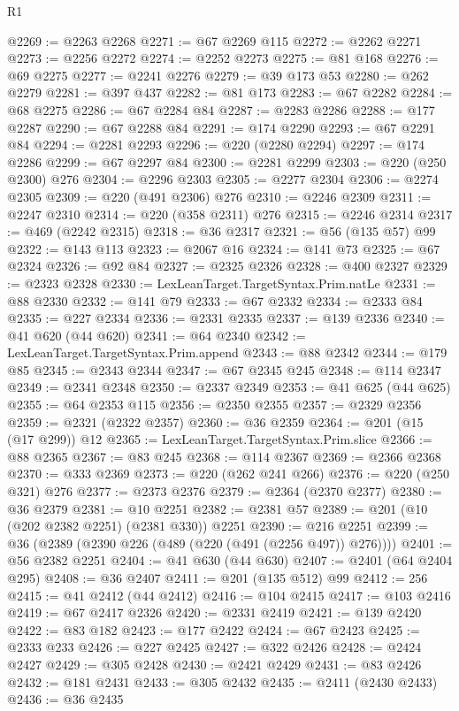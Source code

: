 \begin{lexlean}{R1}
\begin{coremodule}
@2269 := @2263 @2268
@2271 := @67 @2269 @115
@2272 := @2262 @2271
@2273 := @2256 @2272
@2274 := @2252 @2273
@2275 := @81 @168
@2276 := @69 @2275
@2277 := @2241 @2276
@2279 := @39 @173 @53
@2280 := @262 @2279
@2281 := @397 @437
@2282 := @81 @173
@2283 := @67 @2282
@2284 := @68 @2275
@2286 := @67 @2284 @84
@2287 := @2283 @2286
@2288 := @177 @2287
@2290 := @67 @2288 @84
@2291 := @174 @2290
@2293 := @67 @2291 @84
@2294 := @2281 @2293
@2296 := @220 (@2280 @2294)
@2297 := @174 @2286
@2299 := @67 @2297 @84
@2300 := @2281 @2299
@2303 := @220 (@250 @2300) @276
@2304 := @2296 @2303
@2305 := @2277 @2304
@2306 := @2274 @2305
@2309 := @220 (@491 @2306) @276
@2310 := @2246 @2309
@2311 := @2247 @2310
@2314 := @220 (@358 @2311) @276
@2315 := @2246 @2314
@2317 := @469 (@2242 @2315)
@2318 := @36 @2317
@2321 := @56 (@135 @57) @99
@2322 := @143 @113
@2323 := @2067 @16
@2324 := @141 @73
@2325 := @67 @2324
@2326 := @92 @84
@2327 := @2325 @2326
@2328 := @400 @2327
@2329 := @2323 @2328
@2330 := LexLeanTarget.TargetSyntax.Prim.natLe
@2331 := @88 @2330
@2332 := @141 @79
@2333 := @67 @2332
@2334 := @2333 @84
@2335 := @227 @2334
@2336 := @2331 @2335
@2337 := @139 @2336
@2340 := @41 @620 (@44 @620)
@2341 := @64 @2340
@2342 := LexLeanTarget.TargetSyntax.Prim.append
@2343 := @88 @2342
@2344 := @179 @85
@2345 := @2343 @2344
@2347 := @67 @2345 @245
@2348 := @114 @2347
@2349 := @2341 @2348
@2350 := @2337 @2349
@2353 := @41 @625 (@44 @625)
@2355 := @64 @2353 @115
@2356 := @2350 @2355
@2357 := @2329 @2356
@2359 := @2321 (@2322 @2357)
@2360 := @36 @2359
@2364 := @201 (@15 (@17 @299)) @12
@2365 := LexLeanTarget.TargetSyntax.Prim.slice
@2366 := @88 @2365
@2367 := @83 @245
@2368 := @114 @2367
@2369 := @2366 @2368
@2370 := @333 @2369
@2373 := @220 (@262 @241 @266)
@2376 := @220 (@250 @321) @276
@2377 := @2373 @2376
@2379 := @2364 (@2370 @2377)
@2380 := @36 @2379
@2381 := @10 @2251
@2382 := @2381 @57
@2389 := @201 (@10 (@202 @2382 @2251) (@2381 @330)) @2251
@2390 := @216 @2251
@2399 := @36 (@2389 (@2390 @226 (@489 (@220 (@491 (@2256 @497)) @276))))
@2401 := @56 @2382 @2251
@2404 := @41 @630 (@44 @630)
@2407 := @2401 (@64 @2404 @295)
@2408 := @36 @2407
@2411 := @201 (@135 @512) @99
@2412 := 256
@2415 := @41 @2412 (@44 @2412)
@2416 := @104 @2415
@2417 := @103 @2416
@2419 := @67 @2417 @2326
@2420 := @2331 @2419
@2421 := @139 @2420
@2422 := @83 @182
@2423 := @177 @2422
@2424 := @67 @2423
@2425 := @2333 @233
@2426 := @227 @2425
@2427 := @322 @2426
@2428 := @2424 @2427
@2429 := @305 @2428
@2430 := @2421 @2429
@2431 := @83 @2426
@2432 := @181 @2431
@2433 := @305 @2432
@2435 := @2411 (@2430 @2433)
@2436 := @36 @2435

\end{coremodule}
\end{lexlean}
